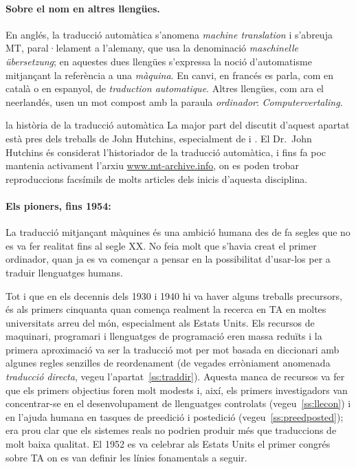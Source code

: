 \paragraph{Sobre el nom en altres llengües.}
En anglés, la traducció automàtica s'anomena \emph{machine
  translation} i s'abreuja MT, paral·lelament a l'alemany, que usa la
denominació \emph{maschinelle übersetzung}; en aquestes dues llengües
s'expressa la noció d'automatisme mitjançant la referència a una {\em
  màquina}. En canvi, en francés es parla, com en català o en
espanyol, de {\em traduction automatique}. Altres llengües, com ara el
neerlandés, usen un mot compost amb la paraula \emph{ordinador}:
\emph{Computervertaling}.

\begin{persabermes}{la història de la traducció automàtica}
  La major part del discutit d'aquest apartat està pres dels treballs
  de John Hutchins, especialment de \cite{hutchins1995} i
  \cite{hutchins2001}. El Dr.\ John Hutchins és considerat
  l'historiador de la traducció automàtica, i fins fa poc mantenia
  activament l'arxiu \url{www.mt-archive.info}, on es poden trobar
  reproduccions facsímils de molts articles dels inicis d'aquesta
  disciplina.

  \paragraph{Els pioners, fins 1954:} La traducció mitjançant màquines
  és una ambició humana des de fa segles que no es va fer realitat
  fins al segle XX. No feia molt que s'havia creat el primer
  ordinador, quan ja es va començar a pensar en la possibilitat
  d'usar-los per a traduir llenguatges humans.

  Tot i que en els decennis dels 1930 i 1940 hi va haver alguns
  treballs precursors, és als primers cinquanta quan comença realment
  la recerca en TA en moltes universitats arreu del món, especialment
  als Estats Units. Els recursos de maquinari, programari i
  llenguatges de programació eren massa reduïts i la primera
  aproximació va ser la traducció mot per mot basada en diccionari amb
  algunes regles senzilles de reordenament (de vegades erròniament
  anomenada \emph{traducció directa}, vegeu
  l'apartat~\ref{ss:traddir}). Aquesta manca de recursos va fer que
  els primers objectius foren molt modests i, així, els primers
  investigadors van concentrar-se en el desenvolupament de llenguatges
  controlats (vegeu~\ref{ss:llecon}) i en l'ajuda humana en tasques de
  preedició i postedició (vegeu~\ref{ss:preedposted}); era prou clar
  que els sistemes reals no podrien produir més que traduccions de
  molt baixa qualitat.  El 1952 es va celebrar als Estats Units el
  primer congrés sobre TA on es van definir les línies fonamentals a
  seguir.


\end{persabermes}
